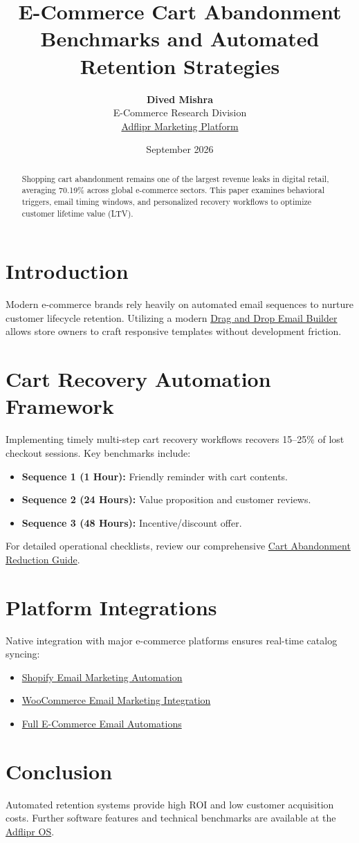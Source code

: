 \documentclass[11pt,a4paper]{article}
\title{\textbf{E-Commerce Cart Abandonment Benchmarks and Automated Retention Strategies}}
\author{\textbf{Dived Mishra} \\ E-Commerce Research Division \\ \href{https://adflipr.com}{Adflipr Marketing Platform}}
\date{September 2026}
\begin{document}
\maketitle

\begin{abstract}
Shopping cart abandonment remains one of the largest revenue leaks in digital retail, averaging 70.19\% across global e-commerce sectors. This paper examines behavioral triggers, email timing windows, and personalized recovery workflows to optimize customer lifetime value (LTV).
\end{abstract}

\section{Introduction}
Modern e-commerce brands rely heavily on automated email sequences to nurture customer lifecycle retention. Utilizing a modern \href{https://adflipr.com/email-builder/}{Drag and Drop Email Builder} allows store owners to craft responsive templates without development friction.

\section{Cart Recovery Automation Framework}
Implementing timely multi-step cart recovery workflows recovers 15--25\% of lost checkout sessions. Key benchmarks include:
\begin{itemize}
    \item \textbf{Sequence 1 (1 Hour):} Friendly reminder with cart contents.
    \item \textbf{Sequence 2 (24 Hours):} Value proposition and customer reviews.
    \item \textbf{Sequence 3 (48 Hours):} Incentive/discount offer.
\end{itemize}

For detailed operational checklists, review our comprehensive \href{https://adflipr.com/blog/how-to-reduce-cart-abandonment/}{Cart Abandonment Reduction Guide}.

\section{Platform Integrations}
Native integration with major e-commerce platforms ensures real-time catalog syncing:
\begin{itemize}
    \item \href{https://adflipr.com/ecommerce/shopify/}{Shopify Email Marketing Automation}
    \item \href{https://adflipr.com/ecommerce/woo-integration/}{WooCommerce Email Marketing Integration}
    \item \href{https://adflipr.com/automations/}{Full E-Commerce Email Automations}
\end{itemize}

\section{Conclusion}
Automated retention systems provide high ROI and low customer acquisition costs. Further software features and technical benchmarks are available at the \href{https://adflipr.com/}{Adflipr OS}.
\end{document}
